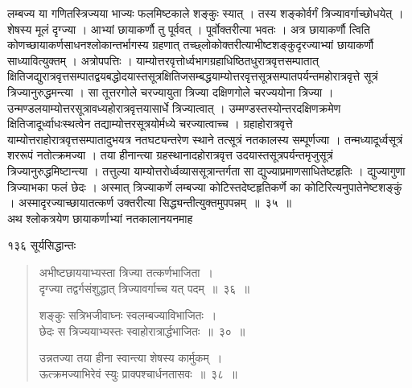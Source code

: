 \documentclass[11pt, openany]{book}
\begin{document}
\begin{sloppypar}
\noindent लम्बज्य या गणितस्त्रिज्यया भाज्यः फलमिष्टकाले शङ्कुः स्यात् । तस्य शङ्कोर्वर्गं त्रिज्यावर्गाच्छोधयेत् । शेषस्य मूलं दृग्ज्या । आभ्यां छायाकर्णौ तु पूर्ववत् । पूर्वोक्तरीत्या भवतः । अत्र छायाकर्णौ त्विति कोणच्छायाकर्णसाधनश्लोकान्तर्भागस्य ग्रहणात् तच्छ्लोकोक्तरीत्याभीष्टशङ्कुदृरज्याभ्यां छायाकर्णौ साध्यावित्युक्तम् । अत्रोपपत्तिः । याम्योत्तरवृत्तोर्ध्वभागग्रहाधिष्ठितधुरात्रवृत्तसम्पातात् क्षितिजद्युरात्रवृत्तसम्पातद्वयबद्धोदयास्तसूत्रक्षितिजसम्बद्धयाम्योत्तरवृत्तसूत्रसम्पातपर्यन्तमहोरात्रवृत्ते सूत्रं त्रिज्यानुरुद्धमन्त्या । सा तूत्तरगोले चरज्यायुता त्रिज्या दक्षिणगोले चरज्ययोना त्रिज्या । उन्मण्डलयाम्योत्तरसूत्रावध्यहोरात्रवृत्तयासार्धे त्रिज्यात्वात् । उम्मण्डस्तस्योन्तरदक्षिणक्रमेण क्षितिजादूर्ध्वाधःस्थत्वेन तद्याम्योत्तरसूत्रयोर्मध्ये चरज्यात्वाच्च । ग्रहाहोरात्रवृत्ते याम्योत्तराहोरात्रवृत्तसम्पातादुभयत्र नतघट्यन्तरेण स्थाने तत्सूत्रं नतकालस्य सम्पूर्णज्या । तन्मध्यादूर्ध्वसूत्रं शररूपं नतोत्क्रमज्या । तया हीनान्त्या ग्रहस्थानादहोरात्रवृत्त उदयास्तसूत्रपर्यन्तमृजुसूत्रं त्रिज्यानुरुद्धमिष्टान्त्या । तत्तुल्या याम्योत्तरोर्ध्वव्याससूत्रान्तर्गता सा द्युज्याप्रमाणसाधितेष्टहृतिः । द्युज्यागुणा त्रिज्याभका फलं छेदः । अस्मात् त्रिज्याकर्णे लम्बज्या कोटिस्तदेष्टहृतिकर्णे का कोटिरित्यनुपातेनेष्टशङ्कुं । अस्मादृरज्याच्छायातत्कर्ण उक्तरीत्या सिद्ध्यन्तीत्युक्तमुपपन्नम्~॥~३५~॥\\
\noindent अथ श्लोकत्रयेण छायाकर्णाभ्यां नतकालानयनमाह\textendash
\end{sloppypar}


\newpage


\noindent १३६ \hspace{4cm} सूर्यसिद्धान्तः 
\vspace{1cm}


\begin{quote}
  {\ssi अभीष्टछाययाभ्यस्ता त्रिज्या तत्कर्णभाजिता~।\\
 दृग्ज्या तद्वर्गसंशुद्धात् त्रिज्यावर्गाच्च यत् पदम्~॥~३६~॥
 
 शङ्कुः सत्रिभजीवाघ्नः स्वलम्बज्याविभाजितः~।\\
 छेदः स त्रिज्ययाभ्यस्तः स्वाहोरात्रार्द्धभाजितः~॥~३०~॥
 
 उन्नतज्या तया हीना स्वान्त्या शेषस्य कार्मुकम्~।\\
 ऊत्क्रमज्याभिरेवं स्युः प्राक्पश्चार्धनतासवः~॥~३८~॥ }
 \end{quote}
\end{document}

